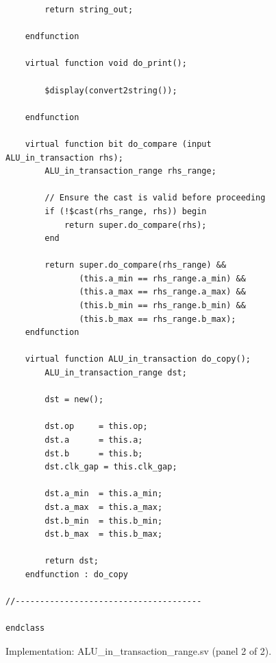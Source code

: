 \documentclass[11pt,a4paper]{article}
\begin{document}
\begin{figure}[!htbp]\begin{minipage}{\linewidth}\fontsize{10}{11.4}\selectfont\begin{verbatim}
        return string_out;

    endfunction

    virtual function void do_print();

        $display(convert2string());

    endfunction

    virtual function bit do_compare (input ALU_in_transaction rhs);
        ALU_in_transaction_range rhs_range;

        // Ensure the cast is valid before proceeding
        if (!$cast(rhs_range, rhs)) begin
            return super.do_compare(rhs);
        end

        return super.do_compare(rhs_range) &&
               (this.a_min == rhs_range.a_min) &&
               (this.a_max == rhs_range.a_max) &&
               (this.b_min == rhs_range.b_min) &&
               (this.b_max == rhs_range.b_max);
    endfunction

    virtual function ALU_in_transaction do_copy();
        ALU_in_transaction_range dst;

        dst = new();
        
        dst.op     = this.op;
        dst.a      = this.a;
        dst.b      = this.b;
        dst.clk_gap = this.clk_gap;

        dst.a_min  = this.a_min;
        dst.a_max  = this.a_max;
        dst.b_min  = this.b_min;
        dst.b_max  = this.b_max;

        return dst;
    endfunction : do_copy

//--------------------------------------

endclass
\end{verbatim}\end{minipage}\caption{Implementation: ALU\_in\_transaction\_range.sv (panel 2 of 2).}\end{figure}
\clearpage
\end{document}
